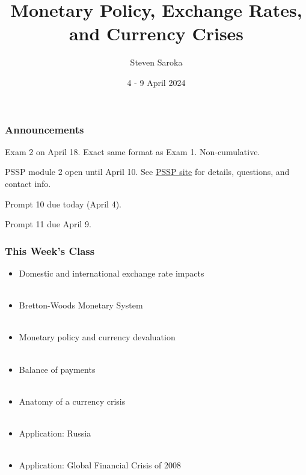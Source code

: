 \documentclass[handout]{beamer}
\title[Monetary Policy]{\LARGE{Monetary Policy, Exchange Rates, and Currency Crises}}
\author[POLI 150]{Steven Saroka}
\institute{POLI 150}
\date{4 - 9 April 2024}
\begin{document}
\begin{frame}
\titlepage %
\end{frame}



\begin{frame} 
	\frametitle{\LARGE{Announcements}}
	\begin{itemize}
		\Large{
			\item Exam 2 on April 18. Exact same format as Exam 1. Non-cumulative.
			\item PSSP module 2 open until April 10. See \href{https://tarheels.live/psspparticipants/}{PSSP site} for details, questions, and contact info.
			\item Prompt 10 due today (April 4).
			\item Prompt 11 due April 9.
		}
	\end{itemize}
\end{frame}

\begin{frame} 
	\frametitle{\LARGE{This Week's Class}}
	\begin{itemize}

			\item Domestic and international exchange rate impacts 
			\\~\\ 
			\item Bretton-Woods Monetary System
			\\~\\
			\item Monetary policy and currency devaluation
			\\~\\
			\item Balance of payments
			\\~\\
			\item Anatomy of a currency crisis
			\\~\\
			\item Application: Russia
			\\~\\ 		
			\item Application: Global Financial Crisis of 2008
		
	\end{itemize}
\end{frame}
\end{document}
